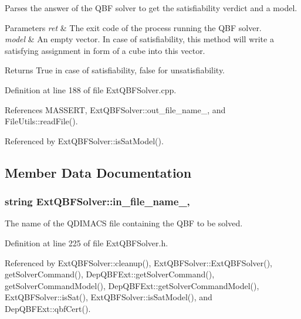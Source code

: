 Parses the answer of the Q\-B\-F solver to get the satisfiability verdict and a model. 


\begin{DoxyParams}{Parameters}
{\em ret} & The exit code of the process running the Q\-B\-F solver. \\
\hline
{\em model} & An empty vector. In case of satisfiability, this method will write a satisfying assignment in form of a cube into this vector. \\
\hline
\end{DoxyParams}
\begin{DoxyReturn}{Returns}
True in case of satisfiability, false for unsatisfiability. 
\end{DoxyReturn}


Definition at line 188 of file Ext\-Q\-B\-F\-Solver.\-cpp.



References M\-A\-S\-S\-E\-R\-T, Ext\-Q\-B\-F\-Solver\-::out\-\_\-file\-\_\-name\-\_\-, and File\-Utils\-::read\-File().



Referenced by Ext\-Q\-B\-F\-Solver\-::is\-Sat\-Model().



\subsection{Member Data Documentation}
\hypertarget{classExtQBFSolver_a04d2ff483c22a11344e46d66ae7e76b1}{
\subsubsection[{in\-\_\-file\-\_\-name\-\_\-}]{\setlength{\rightskip}{0pt plus 5cm}string Ext\-Q\-B\-F\-Solver\-::in\-\_\-file\-\_\-name\-\_\-\hspace{0.3cm}{\ttfamily [protected]}, {\ttfamily [inherited]}}}\label{classExtQBFSolver_a04d2ff483c22a11344e46d66ae7e76b1}


The name of the Q\-D\-I\-M\-A\-C\-S file containing the Q\-B\-F to be solved. 



Definition at line 225 of file Ext\-Q\-B\-F\-Solver.\-h.



Referenced by Ext\-Q\-B\-F\-Solver\-::cleanup(), Ext\-Q\-B\-F\-Solver\-::\-Ext\-Q\-B\-F\-Solver(), get\-Solver\-Command(), Dep\-Q\-B\-F\-Ext\-::get\-Solver\-Command(), get\-Solver\-Command\-Model(), Dep\-Q\-B\-F\-Ext\-::get\-Solver\-Command\-Model(), Ext\-Q\-B\-F\-Solver\-::is\-Sat(), Ext\-Q\-B\-F\-Solver\-::is\-Sat\-Model(), and Dep\-Q\-B\-F\-Ext\-::qbf\-Cert().

